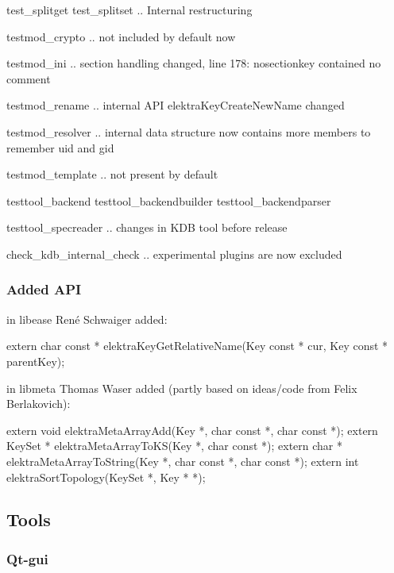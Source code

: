 \begin{DoxyItemize}
\item test\+\_\+splitget test\+\_\+splitset .. Internal restructuring
\item testmod\+\_\+crypto .. not included by default now
\item testmod\+\_\+ini .. section handling changed, line 178\+: {\ttfamily nosectionkey contained no comment}
\item testmod\+\_\+rename .. internal A\+P\+I elektra\+Key\+Create\+New\+Name changed
\item testmod\+\_\+resolver .. internal data structure now contains more members to remember uid and gid
\item testmod\+\_\+template .. not present by default
\item testtool\+\_\+backend testtool\+\_\+backendbuilder testtool\+\_\+backendparser
\item testtool\+\_\+specreader .. changes in K\+D\+B tool before release
\item check\+\_\+kdb\+\_\+internal\+\_\+check .. experimental plugins are now excluded
\end{DoxyItemize}

\subsubsection*{Added A\+P\+I}

in libease René Schwaiger added\+: \begin{DoxyVerb}extern char const * elektraKeyGetRelativeName(Key const * cur, Key const * parentKey);
\end{DoxyVerb}


in libmeta Thomas Waser added (partly based on ideas/code from Felix Berlakovich)\+: \begin{DoxyVerb}extern void elektraMetaArrayAdd(Key *, char const *, char const *);
extern KeySet * elektraMetaArrayToKS(Key *, char const *);
extern char * elektraMetaArrayToString(Key *, char const *, char const *);
extern int elektraSortTopology(KeySet *, Key * *);
\end{DoxyVerb}


\subsection*{Tools}

\subsubsection*{Qt-\/gui}

